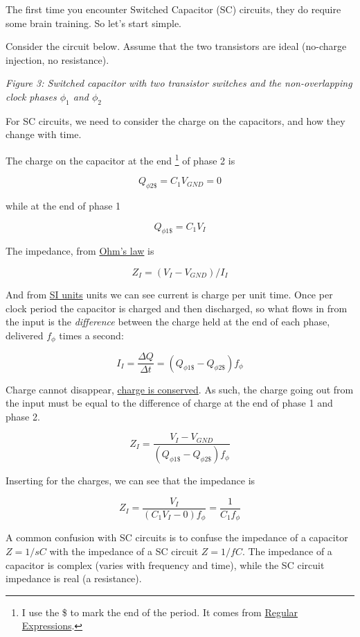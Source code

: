 The first time you encounter Switched Capacitor (SC) circuits, they do
require some brain training. So let's start simple.

Consider the circuit below. Assume that the two transistors are ideal
(no-charge injection, no resistance).


{
\centering
{}
}

\emph{Figure 3: Switched capacitor with two transistor switches and the
non-overlapping clock phases \(\phi_1\) and \(\phi_2\)}

For SC circuits, we need to consider the charge on the capacitors, and
how they change with time.

The charge on the capacitor at the end \footnote{I use the \$ to mark
  the end of the period. It comes from
  \href{https://en.wikipedia.org/wiki/Regular_expression}{Regular
  Expressions}.} of phase 2 is

\[Q_{\phi2\$} = C_1 V_{GND}  = 0\]

while at the end of phase 1

\[Q_{\phi1\$} = C_1 V_{I}\]

The impedance, from
\href{https://en.wikipedia.org/wiki/Ohm\%27s_law}{Ohm's law} is

\[ Z_{I} = (V_{I} - V_{GND})/I_{I}\]

And from
\href{https://analogicus.com/aic2026/a_refresher\#there-are-standard-units-of-measurement}{SI
units} units we can see current is charge per unit time. Once per clock
period the capacitor is charged and then discharged, so what flows in
from the input is the \emph{difference} between the charge held at the
end of each phase, delivered \(f_\phi\) times a second:

\[ I_{I} = \frac{\Delta Q}{\Delta t} = \left(Q_{\phi1\$} - Q_{\phi2\$}\right) f_{\phi}\]

Charge cannot disappear,
\href{https://en.wikipedia.org/wiki/Charge_conservation}{charge is
conserved}. As such, the charge going out from the input must be equal
to the difference of charge at the end of phase 1 and phase 2.

\[ Z_{I} = \frac{V_{I} - V_{GND}}{\left(Q_{\phi1\$} - Q_{\phi2\$}\right) f_{\phi}}\]

Inserting for the charges, we can see that the impedance is

\[ Z_{I} = \frac{V_{I}}{\left(C_1 V_{I} - 0 \right) f_{\phi}} = \frac{1}{C_1 f_\phi}\]

A common confusion with SC circuits is to confuse the impedance of a
capacitor \(Z = 1/sC\) with the impedance of a SC circuit \(Z = 1/fC\).
The impedance of a capacitor is complex (varies with frequency and
time), while the SC circuit impedance is real (a resistance).

